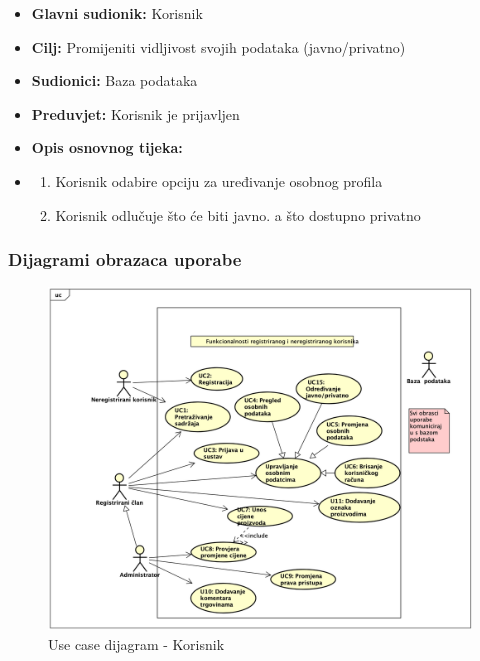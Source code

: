 					
					\noindent {}
					\begin{itemize}
	
						\item \textbf{Glavni sudionik: }Korisnik
						\item  \textbf{Cilj:} Promijeniti vidljivost svojih podataka (javno/privatno)
						\item  \textbf{Sudionici:} Baza podataka
						\item  \textbf{Preduvjet:} Korisnik je prijavljen
						\item  \textbf{Opis osnovnog tijeka:}
						
						\item[] \begin{enumerate}
							\item Korisnik odabire opciju za uređivanje osobnog profila
                                \item Korisnik odlučuje što će biti javno. a što dostupno privatno\\
						\end{enumerate}

					\end{itemize}

                    

                        


     
					
				\subsubsection{Dijagrami obrazaca uporabe}
					
					\begin{figure}[H]
			\includegraphics[width=\textwidth]{slike/Korisnik-izmjena.png} %
			\caption{Use case dijagram - Korisnik}
			\label{fig:Korisnik} %
			\end{figure}
			
